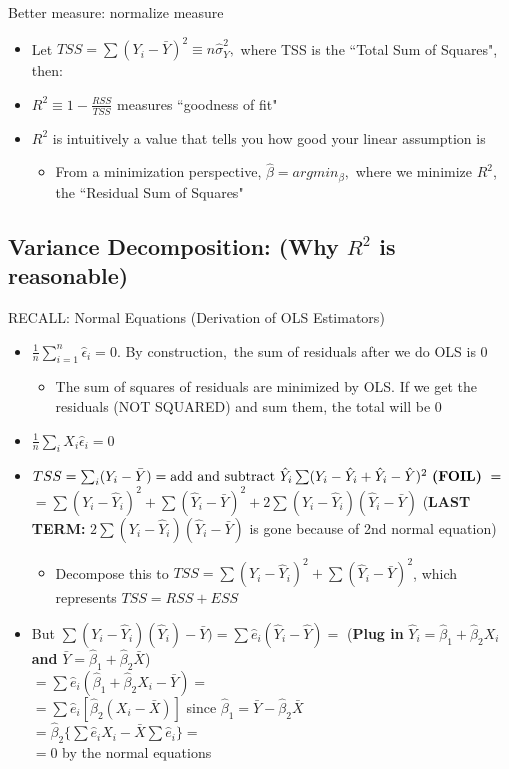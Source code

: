 \documentclass[10pt, oneside]{article}
\begin{document}
Better measure: normalize measure
\begin{itemize}
\item Let $TSS=\sum (Y_i -\bar Y)^2 \equiv n\hat \sigma^2 _Y,$ where TSS is the ``Total Sum of Squares", then:
    \item $R^2\equiv 1-\frac{RSS}{TSS}$ measures ``goodness of fit"
    \item $R^2$ is intuitively a value that tells you how good your linear assumption is
    \begin{itemize}
        \item From a minimization perspective, $\hat \beta = argmin_\beta, $ where we minimize $R^2$, the ``Residual Sum of Squares"
    \end{itemize}
\end{itemize}

\subsection{Variance Decomposition: (Why $R^2$ is reasonable)}
RECALL: Normal Equations (Derivation of OLS Estimators)
\begin{itemize}
    \item $\frac{1}{n} \sum_{i=1} ^n \hat \epsilon_i = 0$. By construction, the sum of residuals after we do OLS is 0
    \begin{itemize}
        \item The sum of squares of residuals are minimized by OLS. If we get the residuals (NOT SQUARED) and sum them, the total will be 0
    \end{itemize}
    \item $\frac{1}{n}\sum_i X_i \hat \epsilon_i = 0$
\end{itemize}

\begin{itemize}
    \item $TSS=\sum_i (Y_i -\bar Y) = \text{add and subtract $\hat Y_i$}\sum(Y_i-\hat Y_i + \hat Y_i -\hat Y)^2 \text{ \textbf{(FOIL)} }= $\\
    $=\sum(Y_i - \hat Y_i)^2 + \sum(\hat Y_i -\bar Y)^2 + 2\sum(Y_i -\hat Y_i) (\hat Y_i -\bar Y)$ (\textbf{LAST TERM: } $2\sum(Y_i -\hat Y_i) (\hat Y_i -\bar Y)$ is gone because of 2nd normal equation)
    \begin{itemize}
        \item Decompose this to $TSS =\sum(Y_i - \hat Y_i)^2 + \sum(\hat Y_i -\bar Y)^2$, which represents $TSS = RSS + ESS$
    \end{itemize}
    \item But $\sum(Y_i -\hat Y_i) (\hat Y_i)-\bar Y)=\sum \hat e_i (\hat Y_i -\hat Y)=$ (\textbf{Plug in} $\hat Y_i = \hat \beta_1 + \hat \beta_2 X_i$ \textbf{and} $\bar Y = \hat \beta_1 + \hat \beta_2 \bar X$)\\
    $=\sum \hat e_i (\hat \beta_1 + \hat \beta_2 X_i - \bar Y)=$\\
    $=\sum \hat e_i[\hat \beta_2 (X_i -\bar X)]$ since $\hat \beta_1 =\bar Y-\hat \beta_2 \bar X$\\
    $=\hat \beta_2 \{\sum\hat e_i X_i -\bar X\sum\hat e_i\}=$\\
    $=0$ by the normal equations
\end{itemize}
\end{document}
